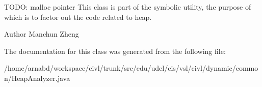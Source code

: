 T\+O\+D\+O\+: malloc pointer This class is part of the symbolic utility, the purpose of which is to factor out the code related to heap.

\begin{DoxyAuthor}{Author}
Manchun Zheng 
\end{DoxyAuthor}


The documentation for this class was generated from the following file\+:\begin{DoxyCompactItemize}
\item 
/home/arnabd/workspace/civl/trunk/src/edu/udel/cis/vsl/civl/dynamic/common/Heap\+Analyzer.\+java\end{DoxyCompactItemize}

